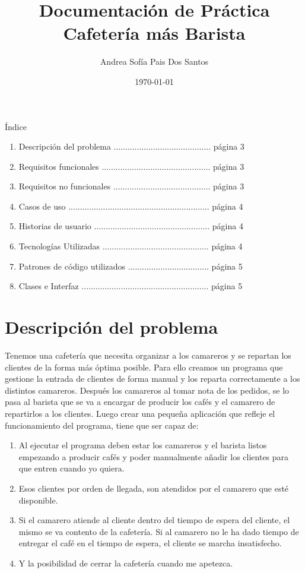 \documentclass[a4paper,12pt]{article}
\title{Documentación de Práctica Cafetería más Barista}
\author{Andrea Sofía Pais Dos Santos}
\date{\today}
\begin{document}
\setlength{\droptitle}{0.4\textheight} 
\maketitle
\thispagestyle{empty}
\newpage 


\vspace{5cm}
Índice

\begin{enumerate}
    \item Descripción del problema .......................................... página 3
    \item Requisitos funcionales ............................................... página 3
    \item Requisitos no funcionales .......................................... página 3
    \item Casos de uso ............................................................. página 4
    \item Historias de usuario .................................................. página 4
    \item Tecnologías Utilizadas .............................................. página 4
    \item Patrones de código utilizados ................................... página 5
    \item Clases e Interfaz ....................................................... página 5
\end{enumerate}
\newpage


\section{Descripción del problema}
Tenemos una cafetería que necesita organizar a los camareros y se repartan los clientes de la forma más óptima posible. Para ello creamos 
un programa que gestione la entrada de clientes de forma manual y los reparta correctamente a los distintos camareros. Después los camareros al tomar nota de los pedidos,
se lo pasa al barista que se va a encargar de producir los cafés y el camarero de repartirlos a los clientes. Luego crear una pequeña aplicación
que refleje el funcionamiento del programa, tiene que ser capaz de:
\begin{enumerate}
\item Al ejecutar el programa deben estar los camareros y el barista listos empezando a producir cafés y poder manualmente añadir los clientes para que entren cuando yo quiera.
\item Esos clientes por orden de llegada, son atendidos por el camarero que esté disponible.
\item Si el camarero atiende al cliente dentro del tiempo de espera del cliente, el mismo se va contento de la cafetería. Si al camarero no le ha dado tiempo de entregar el café en el tiempo de espera, el cliente se marcha insatisfecho.
\item Y la posibilidad de cerrar la cafetería cuando me apetezca.
\end{enumerate}
\end{document}
